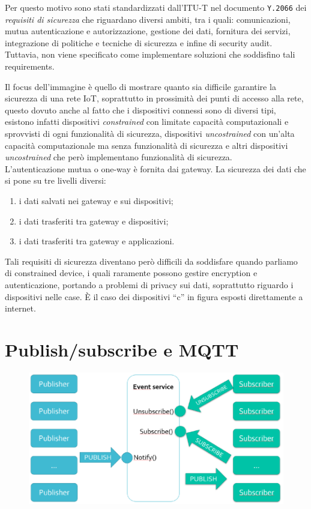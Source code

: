 Per questo motivo sono stati standardizzati dall'ITU-T nel documento \texttt{Y.2066} dei \textit{requisiti di sicurezza} che riguardano diversi ambiti, tra i quali: comunicazioni, mutua autenticazione e autorizzazione, gestione dei dati, fornitura dei servizi, integrazione di politiche e tecniche di sicurezza e infine di security audit.
Tuttavia, non viene specificato come implementare soluzioni che soddisfino tali requirements.

Il focus dell'immagine è quello di mostrare quanto sia difficile garantire la sicurezza di una rete IoT, soprattutto in prossimità dei punti di accesso alla rete, questo dovuto anche al fatto che i dispositivi connessi sono di diversi tipi, esistono infatti dispositivi \emph{constrained} con limitate capacità computazionali e sprovvisti di ogni funzionalità di sicurezza, dispositivi \emph{uncostrained} con un'alta capacità computazionale ma senza funzionalità di sicurezza e altri dispositivi \emph{uncostrained} che però implementano funzionalità di sicurezza.\\
L'autenticazione mutua o one-way è fornita dai gateway. La sicurezza dei dati che si pone su tre livelli diversi: 

\begin{enumerate}
\item i dati salvati nei gateway e sui dispositivi;
\item i dati trasferiti tra gateway e dispositivi;
\item i dati trasferiti tra gateway e applicazioni.
\end{enumerate}

Tali requisiti di sicurezza diventano però difficili da soddisfare quando parliamo di constrained device, i quali raramente possono gestire encryption e autenticazione, portando a problemi di privacy sui dati, soprattutto riguardo i dispositivi nelle case.
È il caso dei dispositivi ``c'' in figura esposti direttamente a internet. 

\section{Publish/subscribe e MQTT}

\begin{figure}[htbp]
   \centering
   \includegraphics{images/questions/Schermata del 2023-10-19 12-23-59.png}
   \label{fig:dom3}
\end{figure}

